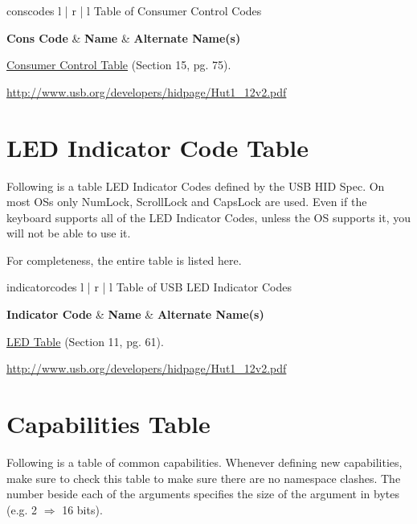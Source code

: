 \documentclass{kiibohd-template}
\begin{document}
\begin{ltable}{conscodes}{ l | r | l }{Table of Consumer Control Codes}

\textbf{Cons Code} & \textbf{Name} & \textbf{Alternate Name(s)} \\
\hline
\hline


\end{ltable}

\href{http://www.usb.org/developers/hidpage/Hut1_12v2.pdf}{Consumer Control Table} (Section 15, pg. 75).

\href{http://www.usb.org/developers/hidpage/Hut1_12v2.pdf}{http://www.usb.org/developers/hidpage/Hut1\_12v2.pdf}


\newpage
\chapter{LED Indicator Code Table}
\label{chpt:LEDIndicatorCodeTable}
Following is a table LED Indicator Codes defined by the USB HID Spec.
On most OSs only NumLock, ScrollLock and CapsLock are used.
Even if the keyboard supports all of the LED Indicator Codes, unless the OS supports it, you will not be able to use it.

For completeness, the entire table is listed here.

\begin{ltable}{indicatorcodes}{ l | r | l }{Table of USB LED Indicator Codes}

\textbf{Indicator Code} & \textbf{Name} & \textbf{Alternate Name(s)} \\
\hline
\hline


\end{ltable}

\href{http://www.usb.org/developers/hidpage/Hut1_12v2.pdf}{LED Table} (Section 11, pg. 61).

\href{http://www.usb.org/developers/hidpage/Hut1_12v2.pdf}{http://www.usb.org/developers/hidpage/Hut1\_12v2.pdf}


\newpage
\chapter{Capabilities Table}
\label{chpt:CapabilitiesTable}

Following is a table of common capabilities.
Whenever defining new capabilities, make sure to check this table to make sure there are no namespace clashes.
The number beside each of the arguments specifies the size of the argument in bytes (e.g. 2 $\Rightarrow$ 16 bits).
\end{document}
